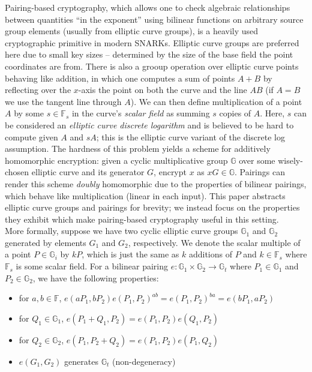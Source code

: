 \noindent Pairing-based cryptography, which allows one to check algebraic relationships between quantities ``in the exponent'' using bilinear functions on arbitrary source group elements (usually from elliptic curve groups), is a heavily used cryptographic primitive in modern SNARKs. Elliptic curve groups are preferred here due to small key sizes -- determined by the size of the base field the point coordinates are from. There is also a grooup operation over elliptic curve points behaving like addition, in which one computes a sum of points $A + B$ by reflecting over the $x$-axis the point on both the curve and the line $AB$ (if $A = B$ we use the tangent line through $A$). We can then define multiplication of a point $A$ by some $s \in \mathbb{F}_s$ in the curve's \textit{scalar field} as summing $s$ copies of $A$. Here, $s$ can be considered an \textit{elliptic curve discrete logarithm} and is believed to be hard to compute given $A$ and $sA$; this is the elliptic curve variant of the discrete log assumption. The hardness of this problem yields a scheme for additively homomorphic encryption: given a cyclic multiplicative group $\mathbb{G}$ over some wisely-chosen elliptic curve and its generator $G$, encrypt $x$ as $xG \in \mathbb{G}$. Pairings can render this scheme \textit{doubly} homomorphic due to the properties of bilinear pairings, which behave like multiplication (linear in each input). This paper abstracts elliptic curve groups and pairings for brevity; we instead focus on the properties they exhibit which make pairing-based cryptography useful in this setting.\\

\noindent More formally, suppose we have two cyclic elliptic curve groups $\mathbb{G}_1$ and $\mathbb{G}_2$ generated by elements $G_1$ and $G_2$, respectively. We denote the scalar multiple of a point $P \in \mathbb{G}_i$ by $kP$, which is just the same as $k$ additions of $P$ and $k \in \mathbb{F}_s$ where $\mathbb{F}_s$ is some scalar field. For a bilinear pairing $e: \mathbb{G}_1 \times \mathbb{G}_2 \to \mathbb{G}_t$ where $P_1 \in \mathbb{G}_1$ and $P_2 \in \mathbb{G}_2$, we have the following properties:
\begin{itemize}
    \item for $a, b \in \mathbb{F}$, $e(aP_1, bP_2) e(P_1, P_2)^{ab} = e(P_1, P_2)^{ba} = e(bP_1, aP_2)$
    \item for $Q_1 \in \mathbb{G}_1$, $e(P_1+Q_1, P_2) = e(P_1, P_2) e(Q_1, P_2)$
    \item for $Q_2 \in \mathbb{G}_2$, $e(P_1, P_2+Q_2) = e(P_1, P_2) e(P_1, Q_2)$
    \item $e(G_1, G_2)$ generates $\mathbb{G}_t$ (non-degeneracy)
\end{itemize}

